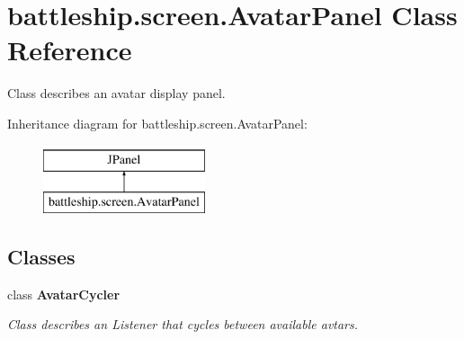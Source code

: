 \hypertarget{classbattleship_1_1screen_1_1AvatarPanel}{}\section{battleship.\+screen.\+Avatar\+Panel Class Reference}
\label{classbattleship_1_1screen_1_1AvatarPanel}


Class describes an avatar display panel.  


Inheritance diagram for battleship.\+screen.\+Avatar\+Panel\+:\begin{figure}[H]
\begin{center}
\leavevmode
\includegraphics[height=2.000000cm]{classbattleship_1_1screen_1_1AvatarPanel}
\end{center}
\end{figure}
\subsection*{Classes}
\begin{DoxyCompactItemize}
\item 
class {\bfseries Avatar\+Cycler}
\begin{DoxyCompactList}\small\item\em Class describes an Listener that cycles between available avtars. \end{DoxyCompactList}\end{DoxyCompactItemize}
